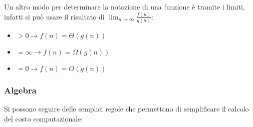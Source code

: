 \documentclass{article}
\begin{document}
\noindent Un altro modo per determinare la notazione di una funzione è tramite i limiti, infatti si può usare il risultato di $\lim_{n\rightarrow\infty}\frac{f(n)}{g(n)}$:
\begin{itemize}
    \item $>0\rightarrow f(n)=\Theta(g(n))$
    \item $=\infty\rightarrow f(n)=\Omega(g(n))$
    \item $=0\rightarrow f(n)=O(g(n))$
\end{itemize}

\subsubsection{Algebra}

Si possono seguire delle semplici regole che permettono di semplificare il calcolo del costo computazionale:
\end{document}
